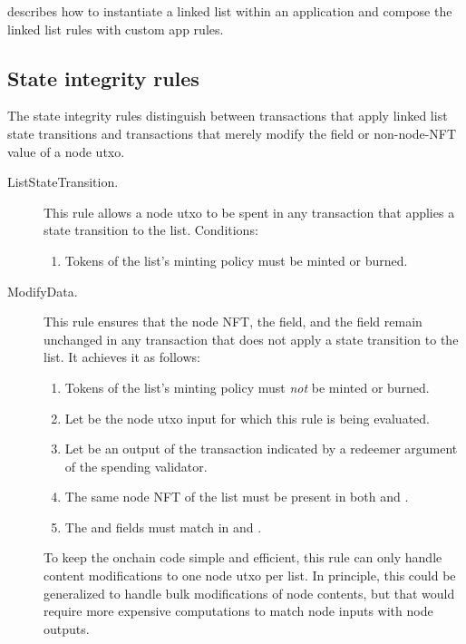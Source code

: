\documentclass[../midgard.tex]{subfiles}
\begin{document}
 describes how to instantiate a linked list within an application and compose the linked list rules with custom app rules.

\subsection{State integrity rules}
\label{h:list-state-integrity-rules}

The state integrity rules distinguish between transactions that apply linked list state transitions and transactions that merely modify the  field or non-node-NFT value of a node utxo.

\begin{description}
    \item[ListStateTransition.]
    This rule allows a node utxo to be spent in any transaction that applies a state transition to the list. Conditions:
    \begin{enumerate}
        \item Tokens of the list's minting policy must be minted or burned.
    \end{enumerate}
    
    \item[ModifyData.]
    This rule ensures that the node NFT, the  field, and the  field remain unchanged in any transaction that does not apply a state transition to the list. It achieves it as follows:

    \begin{enumerate}
        \item Tokens of the list's minting policy must \emph{not} be minted or burned.
        \item Let  be the node utxo input for which this rule is being evaluated.
        \item Let  be an output of the transaction indicated by a redeemer argument of the spending validator.
        \item The same node NFT of the list must be present in both  and .
        \item The  and  fields must match in  and .
    \end{enumerate}
    
    To keep the onchain code simple and efficient, this rule can only handle content modifications to one node utxo per list. In principle, this could be generalized to handle bulk modifications of node contents, but that would require more expensive computations to match node inputs with node outputs.
\end{description}
\end{document}
